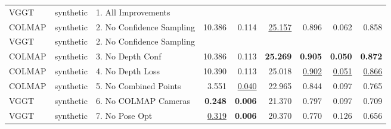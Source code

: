 \begin{table}[H]
\begin{tabular}{lllrrrrrr}
\midrule
VGGT & synthetic & 1. All Improvements &  &  &  &  &  &  \\
COLMAP & synthetic & 2. No Confidence Sampling & 10.386 & 0.114 & \underline{25.157} & 0.896 & 0.062 & 0.858 \\
VGGT & synthetic & 2. No Confidence Sampling &  &  &  &  &  &  \\
COLMAP & synthetic & 3. No Depth Conf & 10.386 & 0.113 & \textbf{25.269} & \textbf{0.905} & \textbf{0.050} & \textbf{0.872} \\
COLMAP & synthetic & 4. No Depth Loss & 10.390 & 0.113 & 25.018 & \underline{0.902} & \underline{0.051} & \underline{0.866} \\
COLMAP & synthetic & 5. No Combined Points & 3.551 & \underline{0.040} & 22.965 & 0.844 & 0.097 & 0.765 \\
VGGT & synthetic & 6. No COLMAP Cameras & \textbf{0.248} & \textbf{0.006} & 21.370 & 0.797 & 0.097 & 0.709 \\
VGGT & synthetic & 7. No Pose Opt & \underline{0.319} & \textbf{0.006} & 20.370 & 0.770 & 0.126 & 0.656 \\
\bottomrule
\end{tabular}
\end{table}